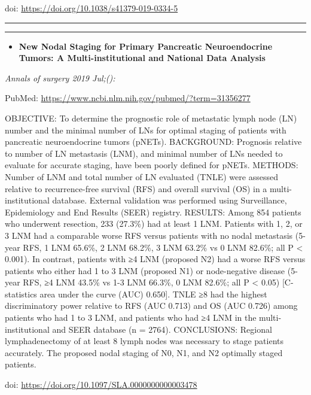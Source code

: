 \documentclass[
]{article}
\providecommand{\tightlist}{%
  \setlength{\itemsep}{0pt}\setlength{\parskip}{0pt}}
\begin{document}
doi: \url{https://doi.org/10.1038/s41379-019-0334-5}

\begin{center}\rule{0.5\linewidth}{0.5pt}\end{center}

\begin{center}\rule{0.5\linewidth}{0.5pt}\end{center}

\begin{itemize}
\tightlist
\item
  \textbf{New Nodal Staging for Primary Pancreatic Neuroendocrine
  Tumors: A Multi-institutional and National Data Analysis}
\end{itemize}

\emph{Annals of surgery 2019 Jul;():}

PubMed: \url{https://www.ncbi.nlm.nih.gov/pubmed/?term=31356277}

OBJECTIVE: To determine the prognostic role of metastatic lymph node
(LN) number and the minimal number of LNs for optimal staging of
patients with pancreatic neuroendocrine tumors (pNETs). BACKGROUND:
Prognosis relative to number of LN metastasis (LNM), and minimal number
of LNs needed to evaluate for accurate staging, have been poorly defined
for pNETs. METHODS: Number of LNM and total number of LN evaluated
(TNLE) were assessed relative to recurrence-free survival (RFS) and
overall survival (OS) in a multi-institutional database. External
validation was performed using Surveillance, Epidemiology and End
Results (SEER) registry. RESULTS: Among 854 patients who underwent
resection, 233 (27.3\%) had at least 1 LNM. Patients with 1, 2, or 3 LNM
had a comparable worse RFS versus patients with no nodal metastasis
(5-year RFS, 1 LNM 65.6\%, 2 LNM 68.2\%, 3 LNM 63.2\% vs 0 LNM 82.6\%;
all P \textless{} 0.001). In contrast, patients with ≥4 LNM (proposed
N2) had a worse RFS versus patients who either had 1 to 3 LNM (proposed
N1) or node-negative disease (5-year RFS, ≥4 LNM 43.5\% vs 1-3 LNM
66.3\%, 0 LNM 82.6\%; all P \textless{} 0.05) {[}C-statistics area under
the curve (AUC) 0.650{]}. TNLE ≥8 had the highest discriminatory power
relative to RFS (AUC 0.713) and OS (AUC 0.726) among patients who had 1
to 3 LNM, and patients who had ≥4 LNM in the multi-institutional and
SEER database (n = 2764). CONCLUSIONS: Regional lymphadenectomy of at
least 8 lymph nodes was necessary to stage patients accurately. The
proposed nodal staging of N0, N1, and N2 optimally staged patients.

doi: \url{https://doi.org/10.1097/SLA.0000000000003478}
\end{document}
